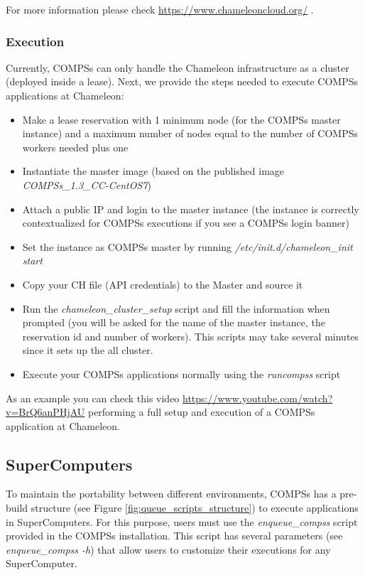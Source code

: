 For more information please check \url{https://www.chameleoncloud.org/} .

\subsubsection{Execution}
Currently, COMPSs can only handle the Chameleon infrastructure as a cluster (deployed inside a lease). Next, we provide the steps
needed to execute COMPSs applications at Chameleon:

\begin{itemize}
 \item Make a lease reservation with 1 minimum node (for the COMPSs master instance) and a maximum number of nodes equal to the
 number of COMPSs workers needed plus one
 \item Instantiate the master image (based on the published image \textit{COMPSs\_1.3\_CC-CentOS7})
 \item Attach a public IP and login to the master instance (the instance is correctly contextualized for COMPSs executions if you
 see a COMPSs login banner)
 \item Set the instance as COMPSs master by running \textit{/etc/init.d/chameleon\_init start}
 \item Copy your CH file (API credentials) to the Master and source it
 \item Run the \textit{chameleon\_cluster\_setup} script and fill the information when prompted (you will be asked for the name of the
 master instance, the reservation id and number of workers). This scripts may take several minutes since it sets up the all cluster.
 \item Execute your COMPSs applications normally using the \textit{runcompss} script
\end{itemize}

As an example you can check this video \url{https://www.youtube.com/watch?v=BrQ6anPHjAU} performing a full setup and 
execution of a COMPSs application at Chameleon.


\subsection{SuperComputers}

To maintain the portability between different environments, COMPSs has a pre-build structure (see Figure 
\ref{fig:queue_scripts_structure}) to execute applications in SuperComputers. For this purpose, users must use 
the \textit{enqueue\_compss} script provided in the COMPSs installation. This script has several parameters (see 
\textit{enqueue\_compss -h}) that allow users to customize their executions for any SuperComputer.

